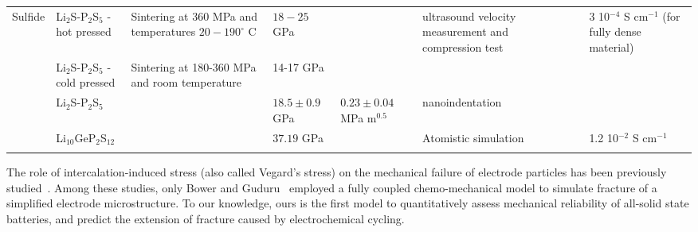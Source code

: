 \documentclass[final,5p,sort&compress]{elsarticle}
\begin{document}
\begin{table*}[]
\begin{adjustbox}{width=1\textwidth}
\begin{tabular}{ l  L{3.5cm}  L{3cm}  L{3cm}  L{2cm}  L{3cm}  L{1.5cm}  L{3cm} }
Sulfide & 
Li$_2$S-P$_2$S$_5$  - hot pressed         & 
{\small{Sintering at 360 MPa and temperatures $20-190^{\circ}$ C        }} & 
$18-25$ GPa                   &                       
& 
ultrasound velocity measurement and compression test & 
\cite{Sakuda2013youngMod} & 
 3 10$^{-4}$ S cm$^{-1}$ 
(for fully dense material) \\
%
& 
Li$_2$S-P$_2$S$_5$ - cold pressed        & 
{\small{Sintering at 180-360 MPa and room temperature}} & 
14-17 GPa                   & 
&  
&                   &   \\
%
 & 
Li$_2$S-P$_2$S$_5$         & 
{\small{}} & 
$18.5 \pm 0.9$ GPa                   &     
$0.23 \pm 0.04$ MPa m$^{0.5}$                  
& 
nanoindentation & 
\cite{McGrogan2016} & 
  \\
%
 & 
Li$_{10}$GeP$_2$S$_{12}$ &                                                                 & 
$37.19$ GPa    &                       
 & 
Atomistic simulation   & 
\cite{Wang2014} & 
1.2 10$^{-2}$ S cm$^{-1}$ \\
\hline                                           &                                      
\end{tabular}
\end{adjustbox}
\end{table*}


The role of intercalation-induced stress (also called Vegard's stress) on the mechanical failure of electrode particles has been previously studied~\cite{woodford2010electrochemical,Bhandakkar20101424, BowerGuduru:2012, Renganathan01022010, Garcia01012005, Wang01112007, Golmon20091567, Zhu01012012, Purkayastha2012, NME:NME5133, Aifantis2005203, Ryu20111717, Aifantis20112122, Kalnaus20118116, Xia201478, Zhang201547,  Hao2013415, Chew20144176, Drozdov201467, Ye2014447, Greve2012377, Wang2012236, Pharr2014569, Min2015835, Zhang2015102, Ma2015114,Zhang2015309, Damle2016373, Laresgoiti, Ryu2014274,Dai, Yang, Dimitrijevic, Lee201637}.
Among these studies,
only Bower and Guduru~\cite{BowerGuduru:2012}
employed a fully coupled chemo-mechanical model to
simulate fracture of a simplified electrode microstructure.
To our knowledge, 
ours is the first model to
quantitatively assess mechanical reliability of all-solid state batteries, and predict the extension of fracture caused by electrochemical cycling.
\end{document}
